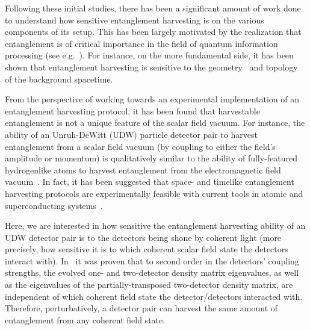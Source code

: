 \documentclass[pra,nofootinbib,floats,aps,twocolumn,tightenlines,superscriptaddress]{revtex4-1}
\begin{document}
Following these initial studies, there has been a significant amount of work done to understand how sensitive entanglement harvesting is on the various components of its setup. This has been largely motivated by the realization that entanglement is of critical importance in the field of quantum information processing (see e.g.~\cite{Nielsen2010}). For instance, on the more fundamental side, it has been shown that entanglement harvesting is sensitive to the geometry~\cite{Steeg2009} and topology~\cite{Martinez2016a} of the background spacetime.

From the perspective of working towards an experimental implementation of an entanglement harvesting protocol, it has been found that harvestable entanglement is not a unique feature of the scalar field vacuum. For instance, the ability of an Unruh-DeWitt (UDW) particle detector pair to harvest entanglement from a scalar field vacuum (by coupling to either the field's amplitude or momentum) is qualitatively similar to the ability of fully-featured hydrogenlike atoms to harvest entanglement from the electromagnetic field vacuum~\cite{Pozas2016}. In fact, it has been suggested that space- and timelike entanglement harvesting protocols are experimentally feasible with current tools in atomic and superconducting systems~\cite{Olson2011,Olson2012,Sabin2012}.


Here, we are interested in how sensitive the entanglement harvesting ability of an UDW detector pair is to the detectors being shone by coherent light (more precisely, how sensitive it is to which coherent scalar field state the detectors interact with). In~\cite{Simidzija2017b} it was proven that to second order in the detectors' coupling strengths, the evolved one- and two-detector density matrix eigenvalues, as well as the eigenvalues of the partially-transposed two-detector density matrix, are independent of which coherent field state the detector/detectors interacted with. Therefore, perturbatively, a detector pair can harvest the same amount of entanglement from any coherent field state. 
\end{document}
